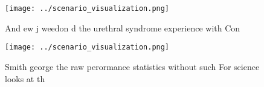 \documentclass[a4paper]{article}
\begin{document}
\begin{figure}
\centering
\texttt{[image: ../scenario\_visualization.png]}
\caption{And ew j weedon d the urethral syndrome experience with Con
}
\end{figure}
 
\begin{figure}
\centering
\texttt{[image: ../scenario\_visualization.png]}
\caption{Smith george the raw perormance statistics without such For science looks at th
}
\end{figure}
 
\end{document}
